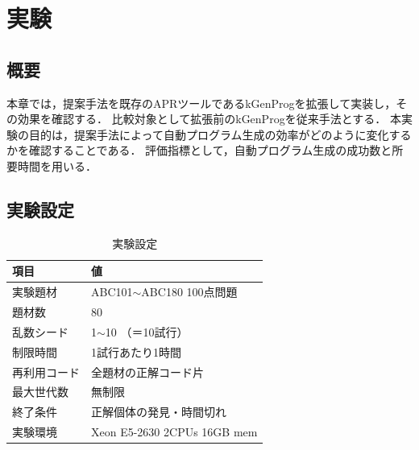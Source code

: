 \documentclass[uplatex,dvipdfmx,a4paper]{jsarticle}
\let\oldcite\cite
\renewcommand{\cite}[1]{\xspace\oldcite{#1}}
\begin{document}


\clearpage
\section{実験} \label{sec:exp}
\subsection{概要}
本章では，提案手法を既存のAPRツールであるkGenProg\cite{higo2018kgenprog}を拡張して実装し，その効果を確認する．
比較対象として拡張前のkGenProgを従来手法とする．
本実験の目的は，提案手法によって自動プログラム生成の効率がどのように変化するかを確認することである．
評価指標として，自動プログラム生成の成功数と所要時間を用いる．

\subsection{実験設定}
\begin{table}[b]
  \centering
  \caption{実験設定}
  \label{tab:exp_setting}
  \begin{tabular}{ll} \hline\hline
    項目         & 値                           \\\hline
    実験題材     & ABC101$\sim$ABC180 100点問題 \\
    題材数       & 80                           \\
    乱数シード   & 1$\sim$10 （＝10試行）       \\
    制限時間     & 1試行あたり1時間             \\
    再利用コード & 全題材の正解コード片         \\
    最大世代数   & 無制限                       \\
    終了条件     & 正解個体の発見・時間切れ     \\
    実験環境     & Xeon E5-2630 2CPUs 16GB mem  \\\hline\hline
  \end{tabular}
\end{table}
\end{document}
